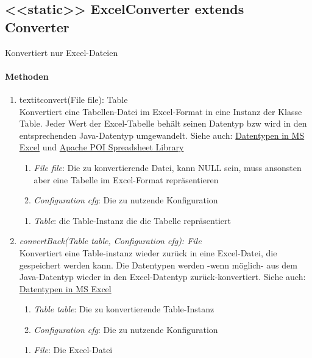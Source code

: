 \subsection{<<static>> ExcelConverter extends Converter}
Konvertiert nur Excel-Dateien \\

\paragraph{Methoden}
\begin{enumerate}[+]
	\item textit{convert(File file): Table} \\
	Konvertiert eine Tabellen-Datei im Excel-Format in eine Instanz der Klasse Table.
	Jeder Wert der Excel-Tabelle behält seinen Datentyp bzw wird in den entsprechenden Java-Datentyp umgewandelt.
	Siehe auch: \href{https://support.office.com/en-us/article/data-types-in-data-models-e2388f62-6122-4e2b-bcad-053e3da9ba90#__toc327893213}{Datentypen in MS Excel} und 
	\href{http://poi.apache.org/spreadsheet/}{Apache POI Spreadsheet Library}	
	\begin{enumerate}[$\bullet$]
		\item \textit{File file}: Die zu konvertierende Datei, kann NULL sein, muss ansonsten aber eine Tabelle im Excel-Format repräsentieren
		\item \textit{Configuration cfg}: Die zu nutzende Konfiguration
	\end{enumerate}
	\vspace{-0.2cm}
	\begin{enumerate}[$\circ$]
		\item \textit{Table}: die Table-Instanz die die Tabelle repräsentiert
	\end{enumerate}
	
	\item \textit{convertBack(Table table, Configuration cfg): File} \\
	Konvertiert eine Table-instanz wieder zurück in eine Excel-Datei, die gespeichert werden kann.
	Die Datentypen werden -wenn möglich- aus dem Java-Datentyp wieder in den Excel-Datentyp zurück-konvertiert.
	Siehe auch: \href{https://support.office.com/en-us/article/data-types-in-data-models-e2388f62-6122-4e2b-bcad-053e3da9ba90#__toc327893213}{Datentypen in MS Excel}
	\begin{enumerate}[$\bullet$]
		\item \textit{Table table}: Die zu konvertierende Table-Instanz
		\item \textit{Configuration cfg}: Die zu nutzende Konfiguration
	\end{enumerate}
	\vspace{-0.2cm}
	\begin{enumerate}[$\circ$]
		\item \textit{File}: Die Excel-Datei
	\end{enumerate}
\end{enumerate}
